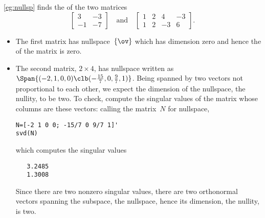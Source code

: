 \begin{example} 
\cref{eg:nullsp} finds the  of the two matrices
\begin{equation*}
\begin{bmatrix} 3&-3\\-1&-7 \end{bmatrix}
\quad\text{and}\quad
\begin{bmatrix} 1&2&4&-3\\
1&2&-3&6 \end{bmatrix}.
\end{equation*}
\begin{itemize}
\item The first matrix has nullspace~\(\{\ov\}\) which has dimension zero and hence the  of the matrix is zero.
\item The second matrix, \(2\times4\), has nullspace written as \(\Span\{(-2,1,0,0)\clb(-\frac{15}7,0,\frac97,1)\}\).
Being spanned by two vectors not proportional to each other, we expect the dimension of the nullspace, the nullity, to be two.
To check, compute the singular values of the matrix whose columns are these vectors: calling the matrix~\(N\) for nullspace,
\begin{verbatim}
N=[-2 1 0 0; -15/7 0 9/7 1]'
svd(N)
\end{verbatim}
\setbox\ajrqrbox\hbox{}%
\marginajrbox%
which computes the singular values
\begin{verbatim}
   3.2485
   1.3008
\end{verbatim}
Since there are two nonzero singular values, there are two orthonormal vectors spanning the subspace, the nullspace, hence its dimension, the nullity, is two.
\end{itemize}
\end{example}



